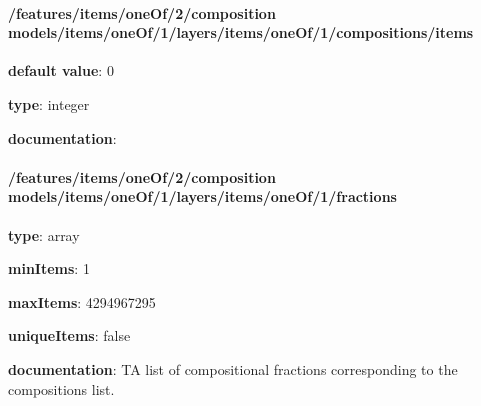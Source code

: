 \begin{itemized}
\paragraph{/features/items/oneOf/2/composition models/items/oneOf/1/layers/items/oneOf/1/compositions/items} \begin{itemized}
\item {\bf default value}: 0
\item {\bf type}: integer
\item {\bf documentation}: 
\end{itemized}\end{itemized}\paragraph{/features/items/oneOf/2/composition models/items/oneOf/1/layers/items/oneOf/1/fractions} \begin{itemized}
\item {\bf type}: array
\item {\bf minItems}: 1
\item {\bf maxItems}: 4294967295
\item {\bf uniqueItems}: false
\item {\bf documentation}: TA list of compositional fractions corresponding to the compositions list.

\end{itemized}

